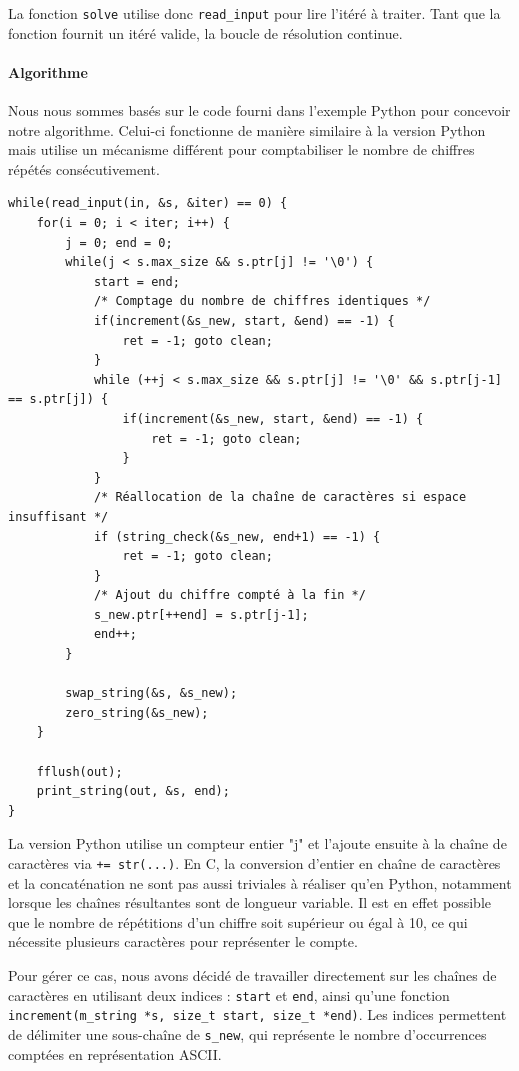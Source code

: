 \documentclass[a4paper,11pt]{article}
\begin{document}
La fonction \texttt{solve} utilise donc \texttt{read\_input} pour lire l'itéré à traiter. Tant que la fonction fournit un itéré valide, la boucle de résolution continue.

\paragraph*{Algorithme}

Nous nous sommes basés sur le code fourni dans l'exemple Python pour concevoir notre algorithme. Celui-ci fonctionne de manière similaire à la version Python mais utilise un mécanisme différent pour comptabiliser le nombre de chiffres répétés consécutivement.

\begin{verbatim}
while(read_input(in, &s, &iter) == 0) {
    for(i = 0; i < iter; i++) {
        j = 0; end = 0; 
        while(j < s.max_size && s.ptr[j] != '\0') {
            start = end;
            /* Comptage du nombre de chiffres identiques */
            if(increment(&s_new, start, &end) == -1) {
                ret = -1; goto clean;
            }
            while (++j < s.max_size && s.ptr[j] != '\0' && s.ptr[j-1] == s.ptr[j]) {
                if(increment(&s_new, start, &end) == -1) {
                    ret = -1; goto clean;
                }
            }
            /* Réallocation de la chaîne de caractères si espace insuffisant */
            if (string_check(&s_new, end+1) == -1) {
                ret = -1; goto clean;
            }
            /* Ajout du chiffre compté à la fin */
            s_new.ptr[++end] = s.ptr[j-1];
            end++;
        }
            
        swap_string(&s, &s_new);
        zero_string(&s_new);
    }
    
    fflush(out);
    print_string(out, &s, end);
}
\end{verbatim}

La version Python utilise un compteur entier "j" et l'ajoute ensuite à la chaîne de caractères via \texttt{+= str(...)}. En C, la conversion d'entier en chaîne de caractères et la concaténation ne sont pas aussi triviales à réaliser qu'en Python, notamment lorsque les chaînes résultantes sont de longueur variable. Il est en effet possible que le nombre de répétitions d'un chiffre soit supérieur ou égal à 10, ce qui nécessite plusieurs caractères pour représenter le compte.

Pour gérer ce cas, nous avons décidé de travailler directement sur les chaînes de caractères en utilisant deux indices : \texttt{start} et \texttt{end}, ainsi qu'une fonction \texttt{increment(m\_string *s, size\_t start, size\_t *end)}. Les indices permettent de délimiter une sous-chaîne de \texttt{s\_new}, qui représente le nombre d’occurrences comptées en représentation ASCII.
\end{document}
